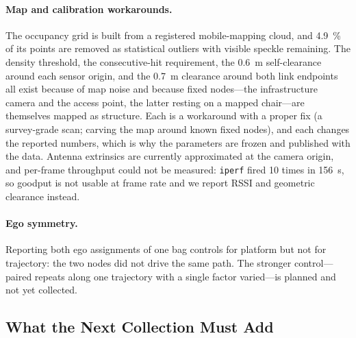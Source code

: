 \paragraph{Map and calibration workarounds.} The occupancy grid is built from a
registered mobile-mapping cloud, and \SI{4.9}{\percent} of its points are
removed as statistical outliers with visible speckle remaining. The density
threshold, the consecutive-hit requirement, the \SI{0.6}{\metre} self-clearance
around each sensor origin, and the \SI{0.7}{\metre} clearance around both link
endpoints all exist because of map noise and because fixed nodes---the
infrastructure camera and the access point, the latter resting on a mapped
chair---are themselves mapped as structure. Each is a workaround with a proper
fix (a survey-grade scan; carving the map around known fixed nodes), and each
changes the reported numbers, which is why the parameters are frozen and
published with the data. Antenna extrinsics are currently approximated at the
camera origin, and per-frame throughput could not be measured: \texttt{iperf}
fired 10 times in \SI{156}{\second}, so goodput is not usable at frame rate and
we report RSSI and geometric clearance instead.

\paragraph{Ego symmetry.} Reporting both ego assignments of one bag controls
for platform but not for trajectory: the two nodes did not drive the same path.
The stronger control---paired repeats along one trajectory with a single factor
varied---is planned and not yet collected.

\subsection{What the Next Collection Must Add}

